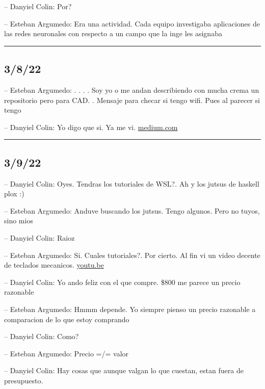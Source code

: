-- Danyiel Colin: Por?

-- Esteban Argumedo: Era una actividad. Cada equipo investigaba
aplicaciones de las redes neuronales con respecto a un campo que la inge
les asignaba

\begin{center}\rule{0.5\linewidth}{0.5pt}\end{center}

\hypertarget{section-27}{%
\subsection{3/8/22}\label{section-27}}

-- Esteban Argumedo: . . . . Soy yo o me andan describiendo con mucha
crema un repositorio pero para CAD. . Mensaje para checar si tengo wifi.
Pues al parecer si tengo

-- Danyiel Colin: Yo digo que si. Ya me vi.
\href{https://medium.com/@knownsec404team/how-to-develop-linux-driver-from-scratch-cc143e0c08a1}{medium.com}

\begin{center}\rule{0.5\linewidth}{0.5pt}\end{center}

\hypertarget{section-28}{%
\subsection{3/9/22}\label{section-28}}

-- Danyiel Colin: Oyes. Tendras los tutoriales de WSL?. Ah y los jutsus
de haskell plox :)

-- Esteban Argumedo: Anduve buscando los jutsus. Tengo algunos. Pero no
tuyos, sino mios

-- Danyiel Colin: Raioz

-- Esteban Argumedo: Si. Cuales tutoriales?. Por cierto. Al fin vi un
video decente de teclados mecanicos.
\href{https://youtu.be/xzWm40Tq4F4}{youtu.be}

-- Danyiel Colin: Yo ando feliz con el que compre. \$800 me parece un
precio razonable

-- Esteban Argumedo: Hmmm depende. Yo siempre pienso un precio razonable
a comparacion de lo que estoy comprando

-- Danyiel Colin: Como?

-- Esteban Argumedo: Precio =/= valor

-- Danyiel Colin: Hay cosas que aunque valgan lo que cuestan, estan
fuera de presupuesto.

